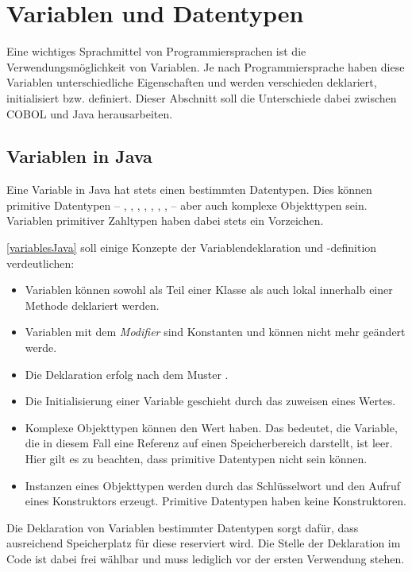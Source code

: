 \section{Variablen und Datentypen} \label{variables}
Eine wichtiges Sprachmittel von Programmiersprachen ist die Verwendungsmöglichkeit von Variablen. Je nach Programmiersprache haben diese Variablen unterschiedliche Eigenschaften und werden verschieden deklariert, initialisiert bzw. definiert. Dieser Abschnitt soll die Unterschiede dabei zwischen COBOL und Java herausarbeiten.

\subsection*{Variablen in Java}
Eine Variable in Java hat stets einen bestimmten Datentypen. Dies können primitive Datentypen -- , , , , , , ,  -- aber auch komplexe Objekttypen sein. Variablen primitiver Zahltypen haben dabei stets ein Vorzeichen.


\autoref{variablesJava} soll einige Konzepte der Variablendeklaration und -definition verdeutlichen:
\begin{itemize}
 \item Variablen können sowohl als Teil einer Klasse als auch lokal innerhalb einer Methode deklariert werden. 
 \item Variablen mit dem \textit{Modifier}  sind Konstanten und können nicht mehr geändert werde.
 \item Die Deklaration erfolg nach dem Muster .
 \item Die Initialisierung einer Variable geschieht durch das zuweisen eines Wertes.
 \item Komplexe Objekttypen können den Wert  haben. Das bedeutet, die Variable, die in diesem Fall eine Referenz auf einen Speicherbereich darstellt, ist leer. Hier gilt es zu beachten, dass primitive Datentypen nicht  sein können. 
 \item Instanzen eines Objekttypen werden durch das Schlüsselwort  und den Aufruf eines Konstruktors erzeugt. Primitive Datentypen haben keine Konstruktoren.
\end{itemize}
Die Deklaration von Variablen bestimmter Datentypen sorgt dafür, dass ausreichend Speicherplatz für diese reserviert wird. Die Stelle der Deklaration im Code ist dabei frei wählbar und muss lediglich vor der ersten Verwendung stehen. 

